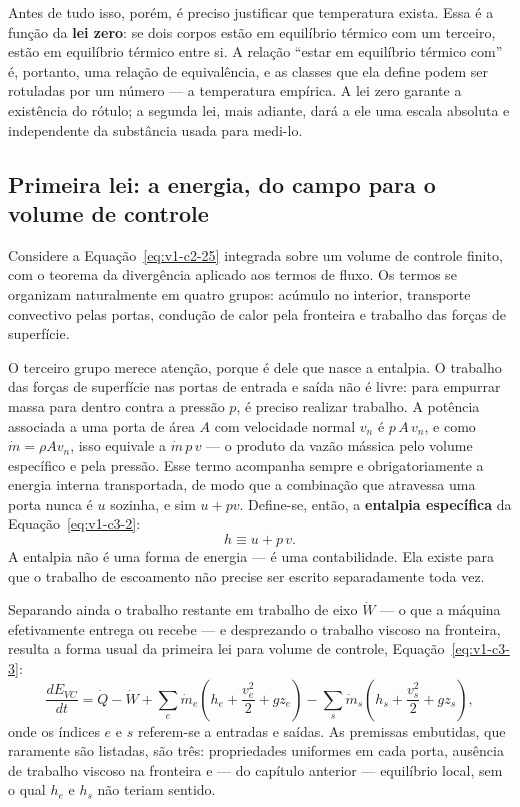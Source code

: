 \documentclass[12pt,a4paper]{article}
\numberwithin{equation}{section}
\numberwithin{table}{section}
\numberwithin{figure}{section}
\begin{document}
Antes de tudo isso, porém, é preciso justificar que temperatura exista. Essa é
a função da \textbf{lei zero}: se dois corpos estão em equilíbrio térmico com
um terceiro, estão em equilíbrio térmico entre si. A relação ``estar em
equilíbrio térmico com'' é, portanto, uma relação de equivalência, e as classes
que ela define podem ser rotuladas por um número --- a temperatura empírica. A
lei zero garante a existência do rótulo; a segunda lei, mais adiante, dará a
ele uma escala absoluta e independente da substância usada para medi-lo.

\subsection{Primeira lei: a energia, do campo para o volume de controle}\label{sub:v1-c3-primeira}

Considere a Equação~\eqref{eq:v1-c2-25} integrada sobre um volume de controle
finito, com o teorema da divergência aplicado aos termos de fluxo. Os termos se
organizam naturalmente em quatro grupos: acúmulo no interior, transporte
convectivo pelas portas, condução de calor pela fronteira e trabalho das forças
de superfície.

O terceiro grupo merece atenção, porque é dele que nasce a entalpia. O trabalho
das forças de superfície nas portas de entrada e saída não é livre: para
empurrar massa para dentro contra a pressão $p$, é preciso realizar trabalho. A
potência associada a uma porta de área $A$ com velocidade normal $v_n$ é
$p\,A\,v_n$, e como $\dot{m} = \rho A v_n$, isso equivale a $\dot{m}\,p\,v$ ---
o produto da vazão mássica pelo volume específico e pela pressão. Esse termo
acompanha sempre e obrigatoriamente a energia interna transportada, de modo que
a combinação que atravessa uma porta nunca é $u$ sozinha, e sim $u + pv$.
Define-se, então, a \textbf{entalpia específica} da
Equação~\eqref{eq:v1-c3-2}:
\begin{equation}\label{eq:v1-c3-2}
h \equiv u + p\,v .
\end{equation}
A entalpia não é uma forma de energia --- é uma contabilidade. Ela existe para
que o trabalho de escoamento não precise ser escrito separadamente toda vez.

Separando ainda o trabalho restante em trabalho de eixo $\dot{W}$ --- o que a
máquina efetivamente entrega ou recebe --- e desprezando o trabalho viscoso na
fronteira, resulta a forma usual da primeira lei para volume de controle,
Equação~\eqref{eq:v1-c3-3}:
\begin{equation}\label{eq:v1-c3-3}
\frac{dE_{VC}}{dt} = \dot{Q} - \dot{W} +
\sum_{e}\dot{m}_e\!\left(h_e + \frac{v_e^2}{2} + gz_e\right) -
\sum_{s}\dot{m}_s\!\left(h_s + \frac{v_s^2}{2} + gz_s\right),
\end{equation}
onde os índices $e$ e $s$ referem-se a entradas e saídas. As premissas
embutidas, que raramente são listadas, são três: propriedades uniformes em cada
porta, ausência de trabalho viscoso na fronteira e --- do capítulo anterior ---
equilíbrio local, sem o qual $h_e$ e $h_s$ não teriam sentido.
\end{document}
